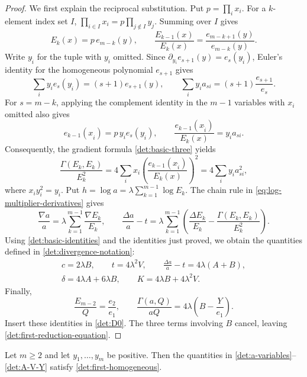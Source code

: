 \begin{proof}
We first explain the reciprocal substitution. Put $p=\prod_i x_i$.
For a $k$-element index set $I$,
$\prod_{i\in I}x_i=p\prod_{j\notin I}y_j$. Summing over $I$ gives
\[
 E_k(x)=p\,e_{m-k}(y),\qquad
 \frac{E_{k-1}(x)}{E_k(x)}
 =\frac{e_{m-k+1}(y)}{e_{m-k}(y)}.
\]
Write $y_{\widehat i}$ for the tuple with $y_i$ omitted. Since \(\partial_{y_i}e_{s+1}(y)=e_s(y_{\widehat i})\),
Euler's identity for the homogeneous polynomial $e_{s+1}$ gives
\[
 \sum_i y_i e_s(y_{\widehat i})=(s+1)e_{s+1}(y),\qquad
 \sum_i y_i a_{si}=(s+1)\frac{e_{s+1}}{e_s}.
\]
For $s=m-k$, applying the complement identity in the $m-1$ variables
with $x_i$ omitted also gives
\[
 e_{k-1}(x_{\widehat i})=p\,y_i e_s(y_{\widehat i}),\qquad
 \frac{e_{k-1}(x_{\widehat i})}{E_k(x)}=y_i a_{si}.
\]
Consequently, the gradient formula \eqref{det:basic-three} yields
\[
 \frac{\Gamma(E_k,E_k)}{E_k^2}
 =4\sum_i x_i\left(\frac{e_{k-1}(x_{\widehat i})}{E_k(x)}\right)^2
 =4\sum_i y_i a_{si}^2,
\]
where $x_i y_i^2=y_i$.
Put
$h=\log a=\lambda\sum_{k=1}^{m-1}\log E_k$.
The chain rule in \eqref{eq:log-multiplier-derivatives} gives
\[
 \frac{\nabla a}{a}=\lambda\sum_{k=1}^{m-1}\frac{\nabla E_k}{E_k},
 \qquad
 \frac{\Delta a}{a}-t
 =\lambda\sum_{k=1}^{m-1}
 \left(\frac{\Delta E_k}{E_k}
       -\frac{\Gamma(E_k,E_k)}{E_k^2}\right).
\]
Using \cref{det:basic-identities} and the identities just proved, we
obtain the quantities defined in \eqref{det:divergence-notation}:
\begin{equation}\label{det:radial-identities}
 \begin{gathered}
 c=2\lambda B,\qquad t=4\lambda^2V,\qquad
 \frac{\Delta a}{a}-t=4\lambda(A+B),\\
 \delta=4\lambda A+6\lambda B,\qquad
 K=4\lambda B+4\lambda^2V.
 \end{gathered}
\end{equation}
Finally,
\[
 \frac{E_{m-2}}Q=\frac{e_2}{e_1},\qquad
 \frac{\Gamma(a,Q)}{aQ}=4\lambda\left(B-\frac{Y}{e_1}\right).
\]
Insert these identities in \eqref{det:D0}.  The three terms involving
$B$ cancel, leaving \eqref{det:first-reduction-equation}.
\end{proof}

\begin{theorem}\label{det:first-inequality}
Let $m\geq2$ and let $y_1,\ldots,y_m$ be positive.
Then the quantities in \eqref{det:a-variables}--\eqref{det:A-V-Y}
satisfy \eqref{det:first-homogeneous}.
\end{theorem}

